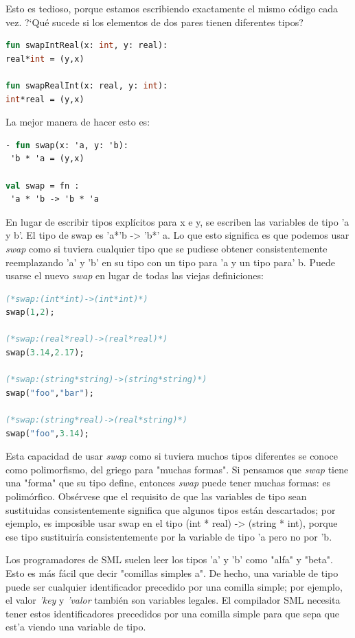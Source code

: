 \documentclass[10pt,journal,compsoc]{IEEEtran}
\begin{document}
Esto es tedioso, porque estamos escribiendo exactamente el mismo c\'odigo cada vez. ?`Qu\'e sucede si los elementos de dos pares tienen diferentes tipos?

\begin{lstlisting}[language=ML, caption=Ejemplo Polimorfismo 2]
fun swapIntReal(x: int, y: real):
real*int = (y,x)

fun swapRealInt(x: real, y: int):
int*real = (y,x)
\end{lstlisting}

La mejor manera de hacer esto es:

\begin{lstlisting}[language=ML, caption=Ejemplo Polimorfismo correcto]
- fun swap(x: 'a, y: 'b):
 'b * 'a = (y,x)
 
val swap = fn :
 'a * 'b -> 'b * 'a
\end{lstlisting}

En lugar de escribir tipos expl\'icitos para x e y, se escriben las variables de tipo 'a y b'. El tipo de swap es 'a*'b -> 'b*' a. Lo que esto significa es que podemos usar \textit{swap} como si tuviera cualquier tipo que se pudiese obtener consistentemente reemplazando 'a' y 'b' en su tipo con un tipo para 'a y un tipo para' b. Puede usarse el nuevo \textit{swap} en lugar de todas las viejas definiciones:

\begin{lstlisting}[language=ML, caption=Ejemplo Polimorfismo con definiciones antiguas]
(*swap:(int*int)->(int*int)*)
swap(1,2);

(*swap:(real*real)->(real*real)*)
swap(3.14,2.17);

(*swap:(string*string)->(string*string)*)
swap("foo","bar");  

(*swap:(string*real)->(real*string)*)
swap("foo",3.14);   
\end{lstlisting}

Esta capacidad de usar \textit{swap} como si tuviera muchos tipos diferentes se conoce como polimorfismo, del griego para "muchas formas". Si pensamos que \textit{swap} tiene una "forma" que su tipo define, entonces \textit{swap} puede tener muchas formas: es polim\'orfico. Obs\'ervese que el requisito de que las variables de tipo sean sustituidas consistentemente significa que algunos tipos est\'an descartados; por ejemplo, es imposible usar swap en el tipo (int * real) -> (string * int), porque ese tipo sustituir\'ia consistentemente por la variable de tipo 'a pero no por 'b.

Los programadores de SML suelen leer los tipos 'a' y 'b' como "alfa" y "beta". Esto es m\'as f\'acil que decir "comillas simples a". De hecho, una variable de tipo puede ser cualquier identificador precedido por una comilla simple; por ejemplo, el valor \textit{'key} y \textit{'valor} tambi\'en son variables legales. El compilador SML necesita tener estos identificadores precedidos por una comilla simple para que sepa que est'a viendo una variable de tipo.
\end{document}
